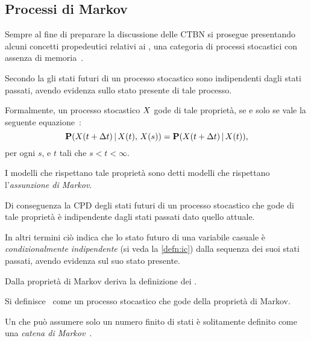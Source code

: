 \subsection{Processi di Markov}
\label{subsec:mps}

Sempre al fine di preparare la discussione delle \acl{CTBN} si prosegue presentando alcuni concetti propedeutici relativi ai \mprocess{}, una categoria di processi stocastici con assenza di memoria~\citep{Loeve1978}.

\begin{definizione}
\label{defn:markov-assumption}
Secondo la  gli stati futuri di un processo stocastico sono indipendenti dagli stati passati, avendo evidenza sullo stato presente di tale processo.

Formalmente, un processo stocastico $\mathnormal{X}$ gode di tale proprietà, se e solo se vale la seguente equazione~\citep{Loeve1978}:
\begin{equation}
\label{eq:markov-assumption}
\mathbf{P}(\mathnormal{X}(t + \Delta t)\,\arrowvert\,\mathnormal{X}(t),\,\mathnormal{X}(s))=\mathbf{P}(\mathnormal{X}(t + \Delta t)\,\arrowvert\,\mathnormal{X}(t))\text{,}
\end{equation}
per ogni $s$, e $t$ tali che $s < t < \infty$.

I modelli che rispettano tale proprietà sono detti modelli che rispettano l'\emph{assunzione di Markov}.
\end{definizione}

Di conseguenza la \acl{CPD} degli stati futuri di un processo stocastico che gode di tale proprietà è indipendente dagli stati passati dato quello attuale.

In altri termini ciò indica che lo stato futuro di una variabile casuale è \emph{condizionalmente indipendente} (si veda la \autoref{defn:ic}) dalla sequenza dei suoi stati passati, avendo evidenza sul suo stato presente.

Dalla proprietà di Markov deriva la definizione dei \mprocess{}.

\begin{definizione}[\upcase\mprocess*{}]
Si definisce~\citep{Loeve1978} come \mprocess*{} un processo stocastico che gode della proprietà di Markov.
\end{definizione}

\begin{definizione}
Un \mprocess*{} che può assumere solo un numero finito di stati è solitamente definito come una \emph{catena di Markov}~\citep[si veda][10]{Norris1998}.
\end{definizione}


